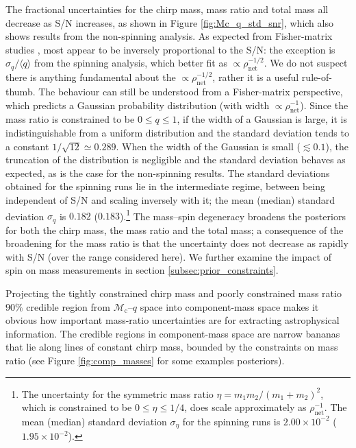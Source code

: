The fractional uncertainties for the chirp mass, mass ratio and total mass all decrease as S/N increases, as shown in Figure \ref{fig:Mc_q_std_snr}, which also shows results from the non-spinning analysis. As expected from Fisher-matrix studies \citep[e.g.,][]{FinnChernoff}, most appear to be inversely proportional to the S/N: the exception is $\sigma_q/\langle q\rangle$ from the spinning analysis, which better fit as $\propto \rho_\mathrm{net}^{-1/2}$. We do not suspect there is anything fundamental about the $\propto \rho_\mathrm{net}^{-1/2}$, rather it is a useful rule-of-thumb. The behaviour can still be understood from a Fisher-matrix perspective, which predicts a Gaussian probability distribution (with width $\propto \rho_\mathrm{net}^{-1}$). Since the mass ratio is constrained to be $0 \leq q \leq 1$, if the width of a Gaussian is large, it is indistinguishable from a uniform distribution and the standard deviation tends to a constant $1/\sqrt{12} \simeq 0.289$. When the width of the Gaussian is small ($\lesssim 0.1$), the truncation of the distribution is negligible and the standard deviation behaves as expected, as is the case for the non-spinning results. The standard deviations obtained for the spinning runs lie in the intermediate regime, between being independent of S/N and scaling inversely with it; the mean (median) standard deviation $\sigma_q$ is $0.182$ ($0.183$).\footnote{The uncertainty  for the symmetric mass ratio $\eta = m_1m_2/(m_1 + m_2)^2$, which is constrained to be $0 \leq \eta \leq 1/4$, does scale approximately as $\rho_\mathrm{net}^{-1}$. The mean (median) standard deviation $\sigma_\eta$ for the spinning runs is $2.00\times 10^{-2}$ ($1.95\times 10^{-2}$).} The mass--spin degeneracy broadens the posteriors for both the chirp mass, the mass ratio and the total mass; a consequence of the broadening for the mass ratio is that the uncertainty does not decrease as rapidly with S/N (over the range considered here). We further examine the impact of spin on mass measurements in section \ref{subsec:prior_constraints}.
  
Projecting the tightly constrained chirp mass and poorly constrained mass ratio $90\%$ credible region from $\mathcal{M}_\mathrm{c}$--$q$ space into component-mass space makes it obvious how important mass-ratio uncertainties are for extracting astrophysical information.  The credible regions in component-mass space are narrow bananas that lie along lines of constant chirp mass, bounded by the constraints on mass ratio (see Figure \ref{fig:comp_masses} for some examples posteriors).
  
  
  